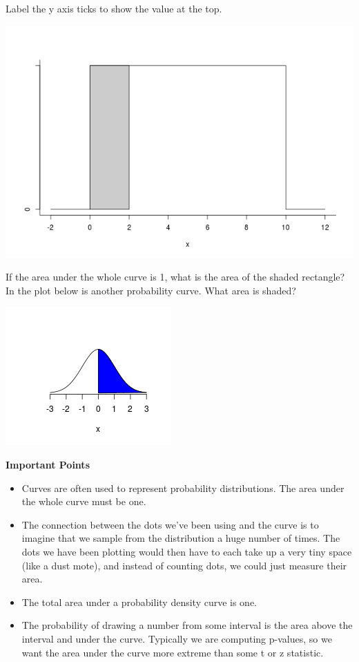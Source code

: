 Label the y axis ticks to show the value at the top. 

\includegraphics[width=.6\linewidth]{plots/uniformDensity0-10.png}


If the area under the whole curve is 1, what is the area of the shaded rectangle?\\

In the plot below is another probability curve. What area is shaded?

\includegraphics[width=.4\linewidth]{../plots/halfNormal.png}


\begin{center}
  {\large\bf Important Points}
\end{center}

\begin{itemize}
\item Curves are often used to represent probability
  distributions. The area under the whole curve must be one.
\item The connection between the dots we've been using and the curve
  is to imagine that we sample from the distribution a huge
  number of times. The dots we have been plotting would then have to
  each take up a very tiny space (like a dust mote), and instead of
  counting dots, we could just measure their area.
\item The total area under a probability density curve is one.
\item The probability of drawing a number from some interval is the
  area above the interval and under the curve.  Typically we are
  computing p-values, so we want the area under the curve more extreme
  than some t or z statistic.
\end{itemize}
